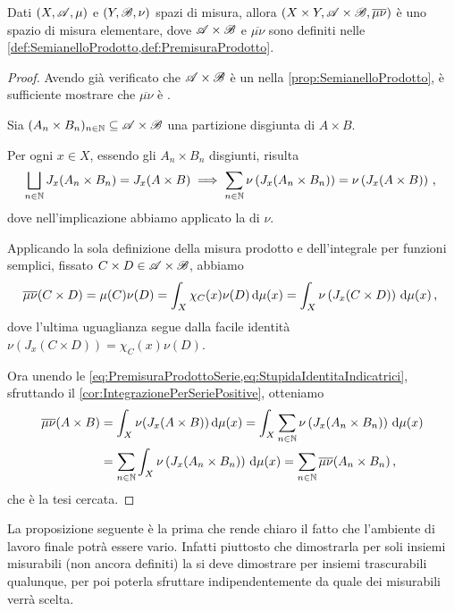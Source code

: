 \begin{theorem}\label{thm:PremisuraProdotto}
	Dati $(X,\mathscr A,\mu)$ e $(Y,\mathscr B,\nu)$ spazi di misura, allora $(X\times Y,\mathscr A\times\mathscr B,\overline{\mu\nu})$ è uno spazio di misura elementare, dove $\mathscr A\times\mathscr B$ e $\overline{\mu\nu}$ sono definiti nelle \cref{def:SemianelloProdotto,def:PremisuraProdotto}.
\end{theorem}
\begin{proof}
	Avendo già verificato che $\mathscr A\times\mathscr B$ è un \semiring{} nella \cref{prop:SemianelloProdotto}, è sufficiente mostrare che $\overline{\mu\nu}$ è \sigadd{}.
	
	Sia $(A_n\times B_n)_{n\in\mathbb N}\subseteq \mathscr A\times \mathscr B$ una partizione disgiunta di $A\times B$.
	
	Per ogni $x\in X$, essendo gli $A_n\times B_n$ disgiunti, risulta
	\begin{equation}\label{eq:PremisuraProdottoSerie}
		\bigsqcup_{n\in\mathbb N} J_x(A_n\times B_n) = J_x(A\times B)  \implies \sum_{n\in\mathbb N}\nu\left(J_x(A_n\times B_n)\right)=\nu\left(J_x(A\times B)\right)\, \text{, }
	\end{equation}
	dove nell'implicazione abbiamo applicato la \sigadd[ità] di $\nu$.
	
	Applicando la sola definizione della misura prodotto e dell'integrale per funzioni semplici, fissato $C\times D\in \mathscr A\times\mathscr B$, abbiamo
	\begin{equation}\label{eq:StupidaIdentitaIndicatrici}
		\overline{\mu\nu}(C\times D)=\mu(C)\nu(D)=\int_{X}\chi_C(x)\nu(D)\,\mathrm d \mu(x)=\int_X \nu\left(J_x(C\times D)\right)\,\mathrm d\mu(x)\, \text{, }
	\end{equation}
	dove l'ultima uguaglianza segue dalla facile identità $\nu\left(J_x(C\times D)\right)=\chi_C(x)\nu(D)$.
	
	Ora unendo le \cref{eq:PremisuraProdottoSerie,eq:StupidaIdentitaIndicatrici}, sfruttando il \cref{cor:IntegrazionePerSeriePositive}, otteniamo
	\begin{align*}
		\overline{\mu\nu}(A\times B)&=\int_X\nu(J_x(A\times B))\,\mathrm d \mu(x)=\int_X\sum_{n\in\mathbb N}\nu\left(J_x(A_n\times B_n)\right)\,\mathrm d\mu(x)\\
		&=\sum_{n\in\mathbb N}\int_X\nu\left(J_x(A_n\times B_n)\right)\,\mathrm d\mu(x)=\sum_{n\in\mathbb N}\overline{\mu\nu}(A_n\times B_n)\, \text{, }
	\end{align*}
	che è la tesi cercata.
\end{proof}

La proposizione seguente è la prima che rende chiaro il fatto che l'ambiente di lavoro finale potrà essere vario. Infatti piuttosto che dimostrarla per soli insiemi misurabili (non ancora definiti) la si deve dimostrare per insiemi trascurabili qualunque, per poi poterla sfruttare indipendentemente da quale \sigalg{} dei misurabili verrà scelta.

